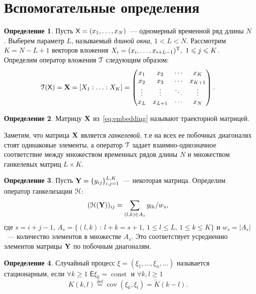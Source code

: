 \documentclass[specialist,
substylefile = spbu.rtx,
               subf,href,colorlinks=true,12pt]{disser}
\theoremstyle{definition}
\newtheorem{definition}{Определение}
\begin{document}
\section{Вспомогательные определения}\label{sect:definitions}
\begin{definition}
	Пусть $\mathsf{X}=(x_1,\ldots,x_N)$~--- одномерный временной ряд длины $N$. Выберем параметр $L$, называемый \emph{длиной окна}, $1<L<N$. Рассмотрим $K=N-L+1$ векторов вложения $X_i=(x_{i},\ldots, x_{i+L-1})^{\mathrm{T}},\ 1\leqslant j \leqslant K$. Определим оператор вложения $\EuScript{T}$ следующим образом:
	\begin{equation}\label{eq:embedding}
		\EuScript{T}(\mathsf{X})=\mathbf{X}=[X_1:\ldots:X_K]=
		\begin{pmatrix}
			x_1    & x_2     & \cdots & x_K     \\
			x_2    & x_3     & \cdots & x_{K+1} \\
			\vdots & \vdots  & \ddots & \vdots  \\
			x_L    & x_{L+1} & \cdots & x_N
		\end{pmatrix}.
	\end{equation}
\end{definition}
\begin{definition}
	Матрицу $\mathbf{X}$ из~\eqref{eq:embedding} называют траекторной матрицей.
\end{definition}\noindent
Заметим, что матрица $\mathbf{X}$ является \emph{ганкелевой}, т.е на всех ее побочных диагоналях стоят одинаковые элементы, а оператор $\EuScript{T}$ задает взаимно-однозначное соответствие между множеством временных рядов длины $N$ и множеством ганкелевых матриц $L\times K$.
\begin{definition}
	Пусть $\mathbf{Y}=\{y_{ij}\}_{i,j=1}^{L,K}$~--- некоторая матрица. Определим оператор ганкелизации $\EuScript{H}$:
	\begin{equation}\label{eq:averaging}
		(\EuScript{H}(\mathbf{Y}))_{ij}=\sum_{(l,k)\in A_s}y_{lk}/w_s,
	\end{equation}
	где $s=i+j-1$, $A_s=\{(l,k)\, :\, l+k=s+1,\, 1\leqslant l\leqslant L,\, 1\leqslant k\leqslant K\}$ и $w_s=|A_s|$~--- количество элементов в множестве $A_s$. Это соответствует
	усреднению элементов матрицы $\mathbf{Y}$ по побочным диагоналям.
\end{definition}
\begin{definition}\label{def:stationaty_random}
	Случайный процесс $\xi=(\xi_1,\ldots, \xi_n,\ldots)$ называется стационарным, если $\forall k\geqslant1$ $\mathsf E\xi_k=\operatorname{const}$ и $\forall k,l\geqslant1$
	\[
	K(k, l)\overset{\text{def}}=\operatorname{cov}(\xi_k, \xi_l)= \widetilde{K}(k-l).
	\]
\end{definition}
\end{document}
